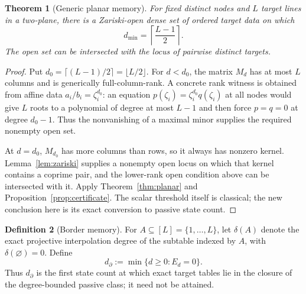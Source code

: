 \documentclass[11pt]{article}
\newtheorem{theorem}{Theorem}[section]
\theoremstyle{definition}\newtheorem{definition}[theorem]{Definition}\newtheorem{example}[theorem]{Example}
\theoremstyle{remark}\newtheorem{remark}[theorem]{Remark}\newtheorem{limitation}[theorem]{Limitation}
\begin{document}
\begin{theorem}[Generic planar memory]\label{thm:generic}
For fixed distinct nodes and $L$ target lines in a two-plane, there is a
Zariski-open dense set of ordered target data on which
\begin{equation}\label{eq:generic}
                 d_{\min}=\left\lceil\frac{L-1}{2}\right\rceil.
\end{equation}
The open set can be intersected with the locus of pairwise distinct targets.
\end{theorem}

\begin{proof}
Put $d_0=\lceil(L-1)/2\rceil=\lfloor L/2\rfloor$.  For $d<d_0$, the matrix
$M_d$ has at most $L$ columns and is generically full-column-rank.  A concrete
rank witness is obtained from affine data $a_i/b_i=\zeta_i^{d_0}$: an equation
$p(\zeta_i)=\zeta_i^{d_0}q(\zeta_i)$ at all nodes would give $L$ roots to a
polynomial of degree at most $L-1$ and then force $p=q=0$ at degree $d_0-1$.
Thus the nonvanishing of a maximal minor supplies the required nonempty open
set.

At $d=d_0$, $M_{d_0}$ has more columns than rows, so it always has nonzero
kernel.  Lemma~\ref{lem:zariski} supplies a nonempty open locus on which that
kernel contains a coprime pair, and the lower-rank open condition above can be
intersected with it.  Apply Theorem~\ref{thm:planar} and
Proposition~\ref{prop:certificate}.  The scalar threshold itself is classical;
the new conclusion here is its exact conversion to passive state count.
\end{proof}

\begin{definition}[Border memory]
For $A\subseteq[L]=\{1,\ldots,L\}$, let $\delta(A)$ denote the exact
projective interpolation degree of the subtable indexed by $A$, with
$\delta(\varnothing)=0$.  Define
\[
 d_\partial:=\min\{d\ge0:E_d=0\}.
\]
Thus $d_\partial$ is the first state count at which exact target tables lie in
the closure of the degree-bounded passive class; it need not be attained.
\end{definition}
\end{document}
